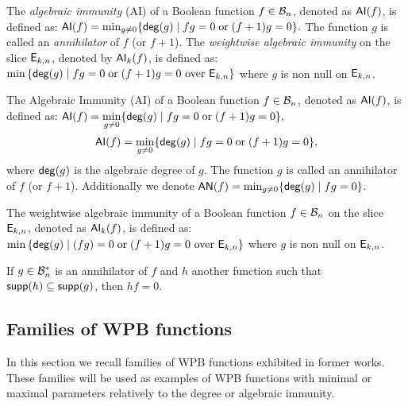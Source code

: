 \documentclass{llncs}
\begin{document}
\ifnum{}

The \emph{algebraic immunity} (AI) of a Boolean function $f\in \mathcal{B}_{n}$, denoted as $\mathsf{AI}(f)$, is defined as:
	$ \mathsf{AI}(f) = \min_{g \neq 0}\{ \mathsf{deg}(g) \; | \; fg = 0 \; \text{or} \; (f + 1)g = 0 \}.$
The function $g$ is called an \emph{annihilator} of $f$ (or $f + 1$). The \emph{weightwise algebraic immunity} on the slice $\mathsf{E}_{k,n}$, denoted by $\mathsf{AI}_{k}(f)$, is defined as: $\displaystyle \min\left\{\mathsf{deg}(g) \; | \; fg = 0 \; \text{or} \; (f + 1)g = 0 \text{ over } \mathsf{E}_{k,n}\right\}$ where $g$ is non null on $\mathsf{E}_{k,n}$.
\else
\begin{definition} \label{def:ai}
The Algebraic Immunity (AI) of a Boolean function $f\in \mathcal{B}_{n}$, denoted as $\mathsf{AI}(f)$, is defined as:
\ifnum{}
	$ \displaystyle \mathsf{AI}(f) = \min_{g \neq 0}\{ \mathsf{deg}(g) \; | \; fg = 0 \; \text{or} \; (f + 1)g = 0 \}{,}$
\else
\[ \mathsf{AI}(f) = \min_{g \neq 0}\{ \mathsf{deg}(g) \; | \; fg = 0 \; \text{or} \; (f + 1)g = 0 \}{,} \]
\fi
	where $\mathsf{deg}(g)$ is the algebraic degree of $g$.	
	The function $g$ is called an annihilator of $f$ (or $f + 1$). 
\ifnum{}
\else
	Additionally we denote $\mathsf{AN}(f) = \min_{g \neq 0}\{ \mathsf{deg}(g) \; | \; fg = 0\}$.
\fi
	
 	The weightwise algebraic immunity of a Boolean function $f\in \mathcal{B}_{n}$ on the slice $\mathsf{E}_{k,n}$, denoted as $\mathsf{AI}_{k}(f)$, is defined as: 
 	$\min\left\{\mathsf{deg}(g) \; | \; (fg)= 0 \; \text{or} \; (f + 1)g = 0 \text{ over } \mathsf{E}_{k,n}\right\}$ where $g$ is non null on $\mathsf{E}_{k,n}$.
\end{definition}
\fi


\ifnum{}
\else
\begin{Prop}\label{prop:suppannhil}
If $g\in \mathcal{B}_{n}^*$ is an annihilator of $f$ and $h$ another function such that $\mathsf{supp}(h)\subseteq \mathsf{supp}(g)$, then $hf=0$. 
\end{Prop}
\fi


\ifnum{}
\else


\subsection{Families of WPB functions}
In this section we recall families of WPB functions exhibited in former works. 
These families will be used as examples of WPB functions with minimal or maximal parameters relatively to the degree or algebraic immunity.
\end{document}
